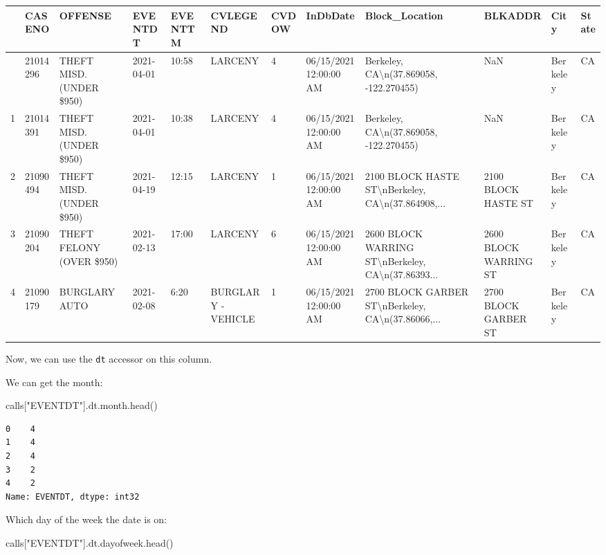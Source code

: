 \documentclass[
  letterpaper,
  DIV=11,
  numbers=noendperiod]{scrreprt}
\newenvironment{Shaded}{\begin{snugshade}}{\end{snugshade}}
\newcommand{\NormalTok}[1]{\textcolor[rgb]{0.00,0.23,0.31}{#1}}
\newcommand{\StringTok}[1]{\textcolor[rgb]{0.13,0.47,0.30}{#1}}
\begin{document}
\begin{longtable}[]{@{}llllllllllll@{}}
\toprule\noalign{}
& CASENO & OFFENSE & EVENTDT & EVENTTM & CVLEGEND & CVDOW & InDbDate &
Block\_Location & BLKADDR & City & State \\
\midrule\noalign{}
\endhead
\bottomrule\noalign{}
\endlastfoot
0 & 21014296 & THEFT MISD. (UNDER \$950) & 2021-04-01 & 10:58 & LARCENY
& 4 & 06/15/2021 12:00:00 AM & Berkeley, CA\textbackslash n(37.869058,
-122.270455) & NaN & Berkeley & CA \\
1 & 21014391 & THEFT MISD. (UNDER \$950) & 2021-04-01 & 10:38 & LARCENY
& 4 & 06/15/2021 12:00:00 AM & Berkeley, CA\textbackslash n(37.869058,
-122.270455) & NaN & Berkeley & CA \\
2 & 21090494 & THEFT MISD. (UNDER \$950) & 2021-04-19 & 12:15 & LARCENY
& 1 & 06/15/2021 12:00:00 AM & 2100 BLOCK HASTE
ST\textbackslash nBerkeley, CA\textbackslash n(37.864908,... & 2100
BLOCK HASTE ST & Berkeley & CA \\
3 & 21090204 & THEFT FELONY (OVER \$950) & 2021-02-13 & 17:00 & LARCENY
& 6 & 06/15/2021 12:00:00 AM & 2600 BLOCK WARRING
ST\textbackslash nBerkeley, CA\textbackslash n(37.86393... & 2600 BLOCK
WARRING ST & Berkeley & CA \\
4 & 21090179 & BURGLARY AUTO & 2021-02-08 & 6:20 & BURGLARY - VEHICLE &
1 & 06/15/2021 12:00:00 AM & 2700 BLOCK GARBER
ST\textbackslash nBerkeley, CA\textbackslash n(37.86066,... & 2700 BLOCK
GARBER ST & Berkeley & CA \\
\end{longtable}

Now, we can use the \texttt{dt} accessor on this column.

We can get the month:

\begin{Shaded}
\begin{Highlighting}[]
\NormalTok{calls[}\StringTok{"EVENTDT"}\NormalTok{].dt.month.head()}
\end{Highlighting}
\end{Shaded}

\begin{verbatim}
0    4
1    4
2    4
3    2
4    2
Name: EVENTDT, dtype: int32
\end{verbatim}

Which day of the week the date is on:

\begin{Shaded}
\begin{Highlighting}[]
\NormalTok{calls[}\StringTok{"EVENTDT"}\NormalTok{].dt.dayofweek.head()}
\end{Highlighting}
\end{Shaded}
\end{document}
